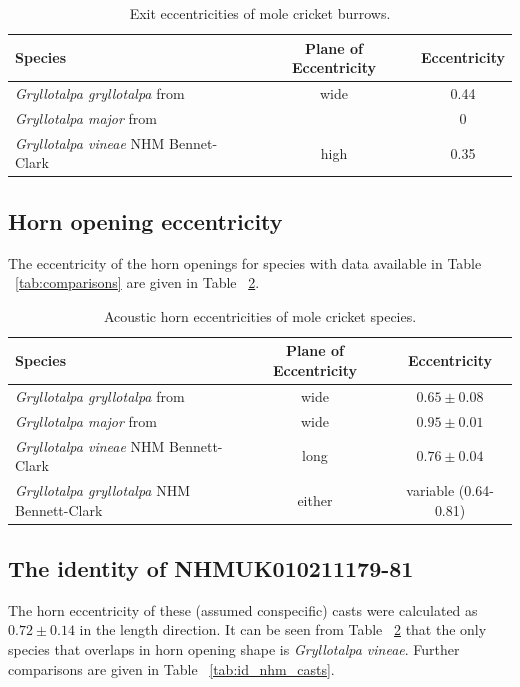 \documentclass{article}
\begin{document}
      \begin{table}[h]
      	\begin{tabular}{|l|c|c|}
      		\hline 	Species &
	      		Plane of Eccentricity &
	      		Eccentricity \\ 
      		\hline  \textit{Gryllotalpa gryllotalpa} from \cite{jafari2015} &
	      		wide &
	      		0.44  \\
      		\hline	\textit{Gryllotalpa major} from \cite{walker1990} &
	      		&
	      		0 \\
	      	\hline	\textit{Gryllotalpa vineae} NHM Bennet-Clark &
		      	high &
		      	0.35 \\
      		\hline 
      	\end{tabular}
      	\caption{Exit eccentricities of mole cricket burrows.}
      	\label{tab:exit_eccentricity}
      \end{table} 
   
   \subsection{Horn opening eccentricity}
   The eccentricity of the horn openings for species with data available in Table ~\ref{tab:comparisons} are given in Table ~\ref{tab:horn_eccentricity}.
   \begin{table}[h]
   \begin{tabular}{|l|c|c|}
   	\hline 	Species &
		   	Plane of Eccentricity &
		   	Eccentricity \\ 
   	\hline  \textit{Gryllotalpa gryllotalpa} from \cite{jafari2015} &
		   	wide &
		   	$0.65\pm0.08$  \\
	\hline	\textit{Gryllotalpa major} from \cite{walker1990} &
			wide &
			$0.95\pm0.01$ \\
	\hline \textit{Gryllotalpa vineae} NHM Bennett-Clark &
			long &
			$0.76\pm0.04$ \\
	\hline	\textit{Gryllotalpa gryllotalpa} NHM Bennett-Clark &
			either &
			variable (0.64-0.81) \\
	
   	\hline 
   \end{tabular}
   \caption{Acoustic horn eccentricities of mole cricket species.}
   \label{tab:horn_eccentricity}
   \end{table} 
   
   \subsection{The identity of NHMUK010211179-81}
   The horn eccentricity of these (assumed conspecific) casts were calculated as $0.72\pm0.14$ in the length direction. It can be seen from Table ~\ref{tab:horn_eccentricity} that the only species that overlaps in horn opening shape is \textit{Gryllotalpa vineae}. Further comparisons are given in Table ~\ref{tab:id_nhm_casts}.
   
\end{document}
